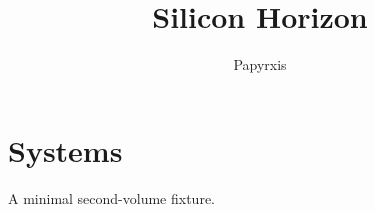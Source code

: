 \documentclass[11pt,oneside]{book}
\title{Silicon Horizon}
\author{Papyrxis}
\begin{document}
\maketitle
\chapter{Systems}
A minimal second-volume fixture.
\end{document}
